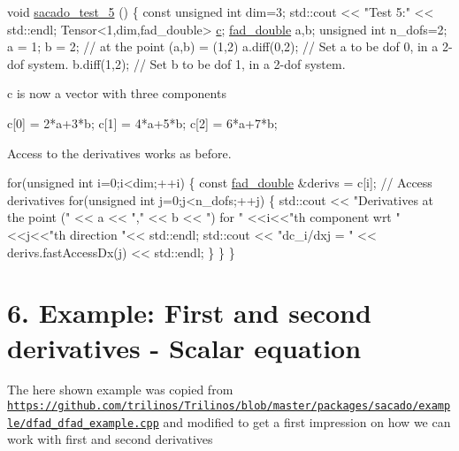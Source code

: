 \begin{DoxyCode}
\textcolor{keywordtype}{void} \hyperlink{Sacado__example_8cc_a327dbbb4ea7fc9840c46d149843a44c2}{sacado\_test\_5} ()
\{
    \textcolor{keyword}{const} \textcolor{keywordtype}{unsigned} \textcolor{keywordtype}{int} dim=3;
    std::cout << \textcolor{stringliteral}{"Test 5:"} << std::endl;
    Tensor<1,dim,fad\_double> \hyperlink{CMakeCache_8txt_aac1d6a1710812201527c735f7c6afbaa}{c};
    \hyperlink{Sacado__example_8cc_a868b94676739e612d9c95940e70892a9}{fad\_double} a,b;
    \textcolor{keywordtype}{unsigned} \textcolor{keywordtype}{int} n\_dofs=2;
    a = 1; b = 2;   \textcolor{comment}{// at the point (a,b) = (1,2)}
    a.diff(0,2);  \textcolor{comment}{// Set a to be dof 0, in a 2-dof system.}
    b.diff(1,2);  \textcolor{comment}{// Set b to be dof 1, in a 2-dof system.}
\end{DoxyCode}
 c is now a vector with three components 
\begin{DoxyCode}
c[0] = 2*a+3*b;
c[1] = 4*a+5*b;
c[2] = 6*a+7*b;
\end{DoxyCode}
 Access to the derivatives works as before. 
\begin{DoxyCode}
    \textcolor{keywordflow}{for}(\textcolor{keywordtype}{unsigned} \textcolor{keywordtype}{int} i=0;i<dim;++i)
    \{
        \textcolor{keyword}{const} \hyperlink{Sacado__example_8cc_a868b94676739e612d9c95940e70892a9}{fad\_double} &derivs = c[i]; \textcolor{comment}{// Access derivatives}
        \textcolor{keywordflow}{for}(\textcolor{keywordtype}{unsigned} \textcolor{keywordtype}{int} j=0;j<n\_dofs;++j)
        \{
            std::cout << \textcolor{stringliteral}{"Derivatives at the point ("} << a << \textcolor{stringliteral}{","} << b << \textcolor{stringliteral}{") for "}
            <<i<<\textcolor{stringliteral}{"th component wrt "}<<j<<\textcolor{stringliteral}{"th direction "}<< std::endl;
            std::cout << \textcolor{stringliteral}{"dc\_i/dxj = "} << derivs.fastAccessDx(j) << std::endl;            
        \}
    \}
\}
\end{DoxyCode}
 \hypertarget{index_Ex6}{}\section{6. Example\+: First and second derivatives -\/ Scalar equation}\label{index_Ex6}
The here shown example was copied from \href{https://github.com/trilinos/Trilinos/blob/master/packages/sacado/example/dfad_dfad_example.cpp}{\tt https\+://github.\+com/trilinos/\+Trilinos/blob/master/packages/sacado/example/dfad\+\_\+dfad\+\_\+example.\+cpp} and modified to get a first impression on how we can work with first and second derivatives 
